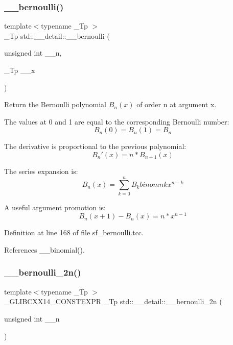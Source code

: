 \mbox{\label{namespacestd_1_1____detail_a1171e65b7fb7712f0181fe7288acb343}} 
\subsubsection{\texorpdfstring{\+\_\+\+\_\+bernoulli()}{\_\_bernoulli()}\hspace{0.1cm}{\footnotesize\ttfamily [2/2]}}
{\footnotesize\ttfamily template$<$typename \+\_\+\+Tp $>$ \\
\+\_\+\+Tp std\+::\+\_\+\+\_\+detail\+::\+\_\+\+\_\+bernoulli (\begin{DoxyParamCaption}\item[{unsigned int}]{\+\_\+\+\_\+n,  }\item[{\+\_\+\+Tp}]{\+\_\+\+\_\+x }\end{DoxyParamCaption})}

Return the Bernoulli polynomial $ B_n(x) $ of order n at argument x.

The values at 0 and 1 are equal to the corresponding Bernoulli number\+: \[ B_n(0) = B_n(1) = B_n \]

The derivative is proportional to the previous polynomial\+: \[ B_n'(x) = n * B_{n-1}(x) \]

The series expansion is\+: \[ B_n(x) = \sum_{k=0}^{n} B_k binom{n}{k} x^{n-k} \]

A useful argument promotion is\+: \[ B_n(x+1) - B_n(x) = n * x^{n-1} \] 

Definition at line 168 of file sf\+\_\+bernoulli.\+tcc.



References \+\_\+\+\_\+binomial().

\mbox{\label{namespacestd_1_1____detail_abd0b1f05f2b32a21cad034b38473bb8b}} 
\subsubsection{\texorpdfstring{\+\_\+\+\_\+bernoulli\+\_\+2n()}{\_\_bernoulli\_2n()}}
{\footnotesize\ttfamily template$<$typename \+\_\+\+Tp $>$ \\
\+\_\+\+G\+L\+I\+B\+C\+X\+X14\+\_\+\+C\+O\+N\+S\+T\+E\+X\+PR \+\_\+\+Tp std\+::\+\_\+\+\_\+detail\+::\+\_\+\+\_\+bernoulli\+\_\+2n (\begin{DoxyParamCaption}\item[{unsigned int}]{\+\_\+\+\_\+n }\end{DoxyParamCaption})}



